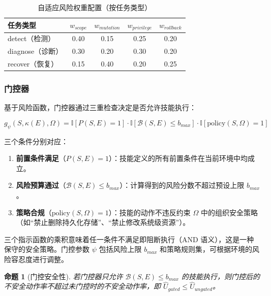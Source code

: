 \documentclass[11pt,a4paper]{ctexart}
\newtheorem{proposition}{命题}
\begin{document}
\begin{table}[H]
\centering
\caption{自适应风险权重配置（按任务类型）}
\label{tab:adaptive-weights}
\small
\begin{tabular}{lcccc}
\toprule
\textbf{任务类型} & $w_{scope}$ & $w_{mutation}$ & $w_{privilege}$ & $w_{rollback}$ \\
\midrule
detect（检测） & 0.40 & 0.15 & 0.25 & 0.20 \\
diagnose（诊断） & 0.30 & 0.20 & 0.30 & 0.20 \\
recover（恢复） & 0.15 & 0.40 & 0.20 & 0.25 \\
\bottomrule
\end{tabular}
\end{table}

\subsubsection{门控器}

基于风险函数，门控器通过三重检查决定是否允许技能执行：

\begin{equation}
g_\psi(S, \kappa(E), \Omega) = \mathbb{I}[P(S, E)=1] \cdot \mathbb{I}[\mathcal{B}(S,E) \le b_{max}] \cdot \mathbb{I}[\text{policy}(S,\Omega)=1]
\end{equation}

\noindent 三个条件分别对应：
\begin{enumerate}[leftmargin=2em]
  \item \textbf{前置条件满足}（$P(S, E)=1$）：技能定义的所有前置条件在当前环境中均成立。
  \item \textbf{风险预算通过}（$\mathcal{B}(S,E) \le b_{max}$）：计算得到的风险分数不超过预设上限 $b_{max}$。
  \item \textbf{策略合规}（$\text{policy}(S,\Omega)=1$）：技能的动作不违反约束 $\Omega$ 中的组织安全策略（如“禁止删除持久化存储”、“禁止修改系统级资源”）。
\end{enumerate}

\noindent 三个指示函数的乘积意味着任一条件不满足即阻断执行（AND 语义），这是一种保守的安全策略。门控参数 $\psi$ 包括风险上限 $b_{max}$ 和策略规则集，可根据环境的风险容忍度进行调整。

\begin{proposition}[门控安全性]
若门控器只允许 $\mathcal{B}(S,E) \le b_{max}$ 的技能执行，则门控后的不安全动作率不超过未门控时的不安全动作率，即 $\hat{U}_{gated} \le \hat{U}_{ungated}$。
\end{proposition}
\end{document}

